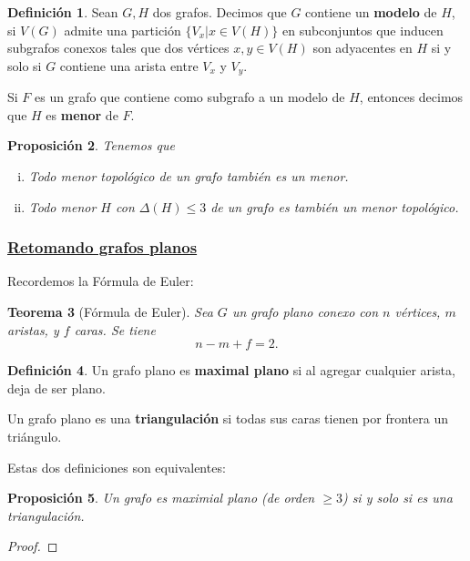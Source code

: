 \documentclass[12pt]{report}
\theoremstyle{plain}
\newtheorem{theorem}{Teorema}[section]
\newtheorem{proposition}[theorem]{Proposición}
\theoremstyle{definition}
\newtheorem{definition}[theorem]{Definición}
\begin{document}
\begin{definition}
Sean $G,H$ dos grafos. Decimos que $G$ contiene un \textbf{modelo} de $H$, si $V(G)$ admite una partición $\{V_x | x \in V(H)\}$ en subconjuntos que inducen subgrafos conexos tales que dos vértices $x,y \in V(H)$ son adyacentes en $H$ si y solo si $G$ contiene una arista entre $V_x$ y $V_y$.
\end{definition}


Si $F$ es un grafo que contiene como subgrafo a un modelo de $H$, entonces decimos que $H$ es \textbf{menor} de $F$.

\begin{proposition}\label{proposition:relaciones entre menor y menor topologico}
Tenemos que
\begin{enumerate}[(i)]
\item Todo menor topológico de un grafo también es un menor.
\item Todo menor $H$ con $\Delta (H) \leq 3$ de un grafo es también un menor topológico.
\end{enumerate}
\end{proposition}

\subsubsection{\underline{Retomando grafos planos}}

Recordemos la Fórmula de Euler:
\begin{theorem}[Fórmula de Euler]
Sea $G$ un grafo plano conexo con $n$ vértices, $m$ aristas, y $f$ caras. Se tiene
\[
    n-m + f = 2.
\]
\end{theorem}

\begin{definition}
Un grafo plano es \textbf{maximal plano} si al agregar cualquier arista, deja de ser plano.

Un grafo plano es una \textbf{triangulación} si todas sus caras tienen por frontera un triángulo.
\end{definition}

Estas dos definiciones son equivalentes:

\begin{proposition}
Un grafo es maximial plano (de orden $\geq 3$) si y solo si es una triangulación.
\end{proposition}
\begin{proof}

\end{proof}
\end{document}
